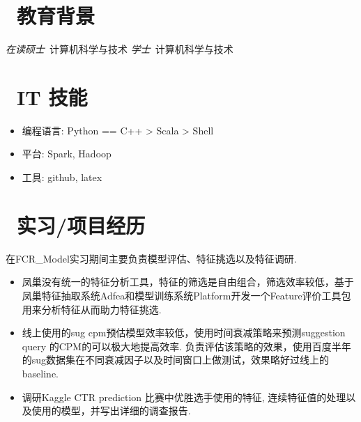 \documentclass{resume}
\begin{document}


 
\section{\faGraduationCap\  教育背景}
\textit{在读硕士}\ 计算机科学与技术
\textit{学士}\ 计算机科学与技术

\section{\faCogs\ IT 技能}
\begin{itemize}[parsep=0.5ex]
  \item 编程语言: Python == C++ > Scala > Shell
  \item 平台: Spark, Hadoop
  \item 工具: github, latex
\end{itemize}

\section{\faUsers\ 实习/项目经历}
\begin{onehalfspacing}
在FCR\_Model实习期间主要负责模型评估、特征挑选以及特征调研.
\begin{itemize}
  \item 凤巢没有统一的特征分析工具，特征的筛选是自由组合，筛选效率较低，基于凤巢特征抽取系统Adfea和模型训练系统Platform开发一个Feature评价工具包用来分析特征从而助力特征挑选.
  \item 线上使用的sug cpm预估模型效率较低，使用时间衰减策略来预测suggestion query 的CPM的可以极大地提高效率. 负责评估该策略的效果，使用百度半年的sug数据集在不同衰减因子以及时间窗口上做测试，效果略好过线上的baseline.
  \item 调研Kaggle CTR prediction 比赛中优胜选手使用的特征, 连续特征值的处理以及使用的模型，并写出详细的调查报告.
\end{itemize}
\end{onehalfspacing}
\end{document}
